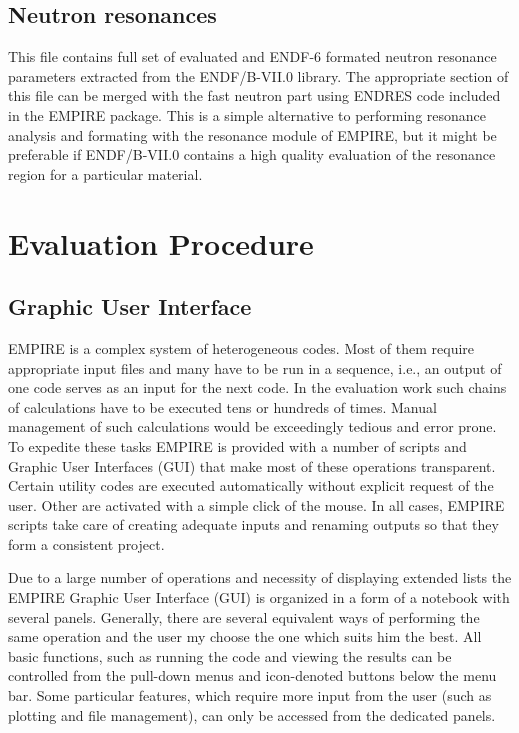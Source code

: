 \documentclass[twocolumn,amsmath,amssymb,10pt,groupedaddress,letter]{revtex4}
\begin{document}
\subsection{Neutron resonances}
This file contains full set of evaluated and ENDF-6 formated
neutron resonance parameters extracted from the ENDF/B-VII.0 library.
The appropriate section of this file can be merged with the fast
neutron part using ENDRES code included in the EMPIRE package. This is a
simple alternative to performing resonance analysis and formating with the
resonance module of EMPIRE, but it might be preferable if ENDF/B-VII.0
contains a high quality evaluation of the resonance region for a particular
material.

\section{Evaluation Procedure}

\subsection{Graphic User Interface}
EMPIRE is a complex system of heterogeneous codes. Most of them require
appropriate input files and many have to be run in a sequence, i.e., an output of one code serves
as an input for the next code. In the evaluation work such chains of
calculations have to be executed tens or hundreds of times. Manual  management of such calculations
would be exceedingly tedious and error prone. To expedite these tasks EMPIRE is provided with a number of scripts and Graphic User Interfaces (GUI) that make most of these operations transparent.
Certain utility codes are executed automatically without explicit request of the user.
Other are activated with a simple click of the mouse. In all cases, EMPIRE scripts take
care of creating adequate inputs and renaming outputs so that they form a consistent project.

Due to a large number of operations and necessity of displaying extended lists the EMPIRE Graphic User Interface (GUI)
is organized in a form of a notebook with several panels. Generally,
there are several equivalent ways of performing the same operation
and the user my choose the one which suits him the best. All basic functions,
such as running the code and viewing the results can be controlled from
the pull-down menus and icon-denoted buttons below the menu bar.
Some particular features, which require more input from the user (such as plotting and file management), can only be accessed from the dedicated panels.
\end{document}
